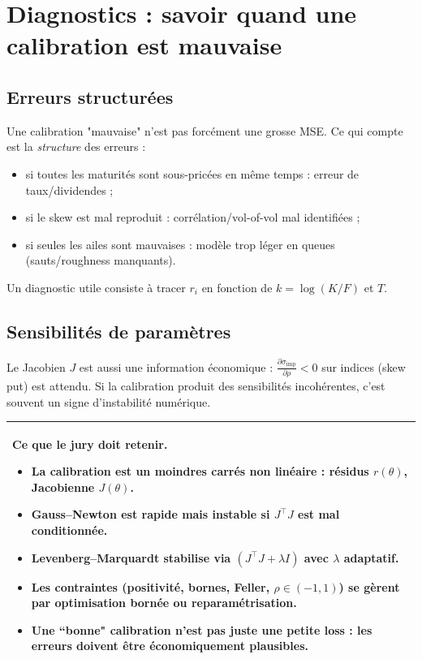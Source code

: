 \documentclass[11pt,a4paper]{report}
\newcommand{\1}{\mathbbm{1}}
\newcommand{\pd}[2]{\frac{\partial #1}{\partial #2}}
\theoremstyle{definition}
\theoremstyle{plain}
\theoremstyle{remark}
\newenvironment{jurybox}{%
  \begin{center}
  \setlength{\tabcolsep}{6pt}%
  \renewcommand{\arraystretch}{1.1}%
  \begin{tabular}{|p{0.94\textwidth}|}
  \hline
  \small\textbf{Ce que le jury doit retenir.}\par\medskip
}{%
  \\ \hline
  \end{tabular}
  \end{center}
}
\begin{document}
\section{Diagnostics : savoir quand une calibration est mauvaise}

\subsection{Erreurs structurées}
Une calibration "mauvaise" n'est pas forcément une grosse MSE. Ce qui compte est la \emph{structure} des erreurs :
\begin{itemize}
  \item si toutes les maturités sont sous-pricées en même temps : erreur de taux/dividendes ;
  \item si le skew est mal reproduit : corrélation/vol-of-vol mal identifiées ;
  \item si seules les ailes sont mauvaises : modèle trop léger en queues (sauts/roughness manquants).
\end{itemize}
Un diagnostic utile consiste à tracer $r_i$ en fonction de $k=\log(K/F)$ et $T$.

\subsection{Sensibilités de paramètres}
Le Jacobien $J$ est aussi une information économique :
\(\pd{\sigma_{\mathrm{imp}}}{\rho}<0\) sur indices (skew put) est attendu.
Si la calibration produit des sensibilités incohérentes, c'est souvent un signe d'instabilité numérique.

\begin{jurybox}
\begin{itemize}
\item La calibration est un moindres carrés non linéaire : résidus $r(\theta)$, Jacobienne $J(\theta)$.
\item Gauss--Newton est rapide mais instable si $J^\top J$ est mal conditionnée.
\item Levenberg--Marquardt stabilise via $(J^\top J+\lambda I)$ avec $\lambda$ adaptatif.
\item Les contraintes (positivité, bornes, Feller, $\rho\in(-1,1)$) se gèrent par optimisation bornée ou reparamétrisation.
\item Une ``bonne" calibration n'est pas juste une petite loss : les erreurs doivent être économiquement plausibles.
\end{itemize}
\end{jurybox}
\end{document}
